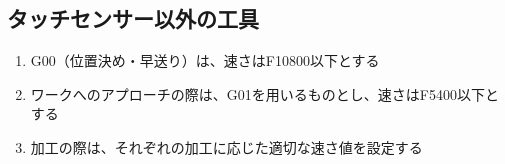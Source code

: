 \subsection{タッチセンサー以外の工具}
\begin{enumerate}
\item G00（位置決め・早送り）は、速さはF10800以下とする
\item ワークへのアプローチの際は、G01を用いるものとし、速さはF5400以下とする
\item 加工の際は、それぞれの加工に応じた適切な速さ値を設定する
\end{enumerate}
